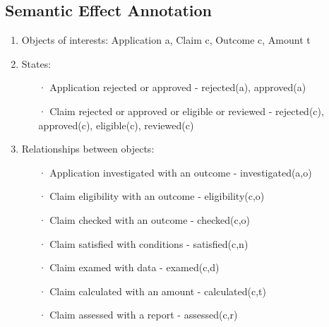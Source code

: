 \documentclass[runningheads]{llncs}
\begin{document}
\subsection{Semantic Effect Annotation}
\begin{enumerate}
    \item Objects of interests: Application a, Claim c, Outcome c, Amount t
    \item States:
        \begin{itemize}
            \item[·] Application rejected or approved - rejected(a), approved(a)
            \item[·] Claim rejected or approved or  eligible or reviewed - rejected(c), approved(c), eligible(c), reviewed(c)
        \end{itemize}
    \item Relationships between objects:
        \begin{itemize}
            \item[·] Application investigated with an outcome - investigated(a,o)
            \item[·] Claim eligibility with an outcome - eligibility(c,o)
            \item[·] Claim checked with an outcome - checked(c,o)
            \item[·] Claim satisfied with conditions - satisfied(c,n)
            \item[·] Claim examed with data - examed(c,d)
            \item[·] Claim calculated with an amount - calculated(c,t)
            \item[·] Claim assessed with a report - assessed(c,r)
        \end{itemize}
    
\end{enumerate}
\end{document}
